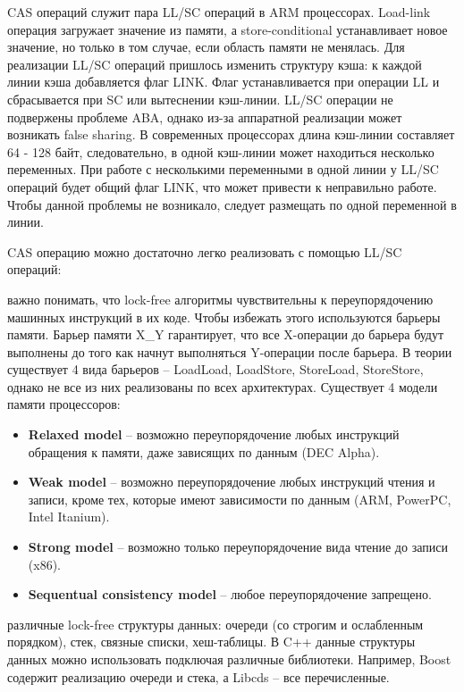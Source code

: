 {	 CAS операций служит пара LL/SC операций в ARM процессорах. Load-link операция загружает значение из памяти, а store-conditional устанавливает новое значение, но только в том случае, если область памяти не менялась. Для реализации LL/SC операций пришлось изменить структуру кэша: к каждой линии кэша добавляется флаг LINK. Флаг устанавливается при операции LL и сбрасывается при SC или вытеснении кэш-линии. LL/SC операции не подвержены проблеме ABA, однако из-за аппаратной реализации может возникать false sharing. В современных процессорах длина кэш-линии составляет 64 - 128 байт, следовательно, в одной кэш-линии может находиться несколько переменных. При работе с несколькими переменными в одной линии у LL/SC операций будет общий флаг LINK, что может привести к неправильно работе. Чтобы данной проблемы не возникало, следует размещать по одной переменной в линии.
	\begin{figure}[H]
		
	\end{figure}
	\par CAS операцию можно достаточно легко реализовать с помощью LL/SC операций:
	\begin{figure}[H]
		
	\end{figure}
	 важно понимать, что lock-free алгоритмы чувствительны к переупорядочению машинных инструкций в их коде. Чтобы избежать этого используются барьеры памяти. Барьер памяти X\_Y гарантирует, что все X-операции до барьера будут выполнены до того как начнут выполняться Y-операции после барьера. В теории существует 4 вида барьеров -- LoadLoad, LoadStore, StoreLoad, StoreStore, однако не все из них реализованы по всех архитектурах. Существует 4 модели памяти процессоров: 
	\begin{itemize}  
		\item\textbf{Relaxed model} -- возможно переупорядочение любых инструкций обращения к памяти, даже зависящих по данным (DEC Alpha).
		\item\textbf{Weak model} -- возможно переупорядочение любых инструкций чтения и записи, кроме тех, которые имеют зависимости по данным (ARM, PowerPC, Intel Itanium).
		\item\textbf{Strong model } -- возможно только переупорядочение вида чтение до записи (x86).
		\item\textbf{Sequentual consistency model} -- любое переупорядочение запрещено.
	\end{itemize}
	 различные lock-free структуры данных: очереди (со строгим и ослабленным порядком), стек, связные списки, хеш-таблицы. В C++ данные структуры данных можно использовать подключая различные библиотеки. Например, Boost содержит реализацию очереди и стека, а Libcds -- все перечисленные.
}
